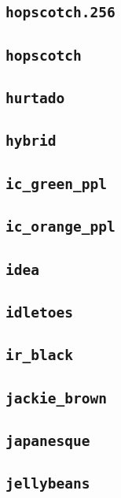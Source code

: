 \subsection{\texttt{hopscotch.256}}
\newpage
\subsection{\texttt{hopscotch}}
\newpage
\subsection{\texttt{hurtado}}
\newpage
\subsection{\texttt{hybrid}}
\newpage
\subsection{\texttt{ic\_green\_ppl}}
\newpage
\subsection{\texttt{ic\_orange\_ppl}}
\newpage
\subsection{\texttt{idea}}
\newpage
\subsection{\texttt{idletoes}}
\newpage
\subsection{\texttt{ir\_black}}
\newpage
\subsection{\texttt{jackie\_brown}}
\newpage
\subsection{\texttt{japanesque}}
\newpage
\subsection{\texttt{jellybeans}}
\newpage
